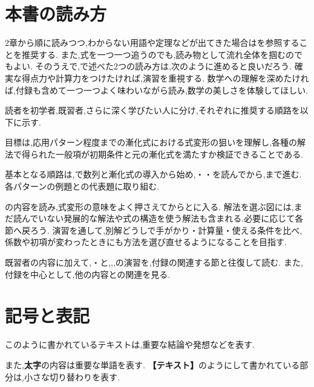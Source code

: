 \begin{bookcolumns}
  \section{本書の読み方}\label{節：本書の読み方}
  2章から順に読みつつ,わからない用語や定理などが出てきた場合はを参照することを推奨する.
  また,式を一つ一つ追うのでも,読み物として流れ全体を掴むのでもよい.
  そのうえで,で述べた2つの読み方は,次のように進めると良いだろう.
  確実な得点力や計算力をつけたければ,演習を重視する.
  数学への理解を深めたければ,付録も含めて一つ一つよく味わいながら読み,数学の美しさを体験してほしい.

  読者を初学者,既習者,さらに深く学びたい人に分け,それぞれに推奨する順路を以下に示す.

  目標は,応用パターン程度までの漸化式における式変形の狙いを理解し,各種の解法で得られた一般項が初期条件と元の漸化式を満たすか検証できることである.

  基本となる順路は,で数列と漸化式の導入から始め,・・を読んでから,まで進む.
  各パターンの例題との代表題に取り組む.

  の内容を読み,式変形の意味をよく押さえてからとに入る.
  解法を選ぶ図には,まだ読んでいない発展的な解法や式の構造を使う解法も含まれる.必要に応じて各節へ戻ろう.
  演習を通して,別解どうしで手がかり・計算量・使える条件を比べ,係数や初項が変わったときにも方法を選び直せるようになることを目指す.

  既習者の内容に加えて,・と,,,の演習を,付録の関連する節と往復して読む.
  また,付録を中心として,他の内容との関連を見る.

  \section{記号と表記}\label{節：記号と表記}
  \begin{bookpoint}
    このように書かれているテキストは,重要な結論や発想などを表す.
  \end{bookpoint}
  また,\textbf{太字}の内容は重要な単語を表す.
  \textbf{【テキスト】}のようにして書かれている部分は,小さな切り替わりを表す.


\end{bookcolumns}
